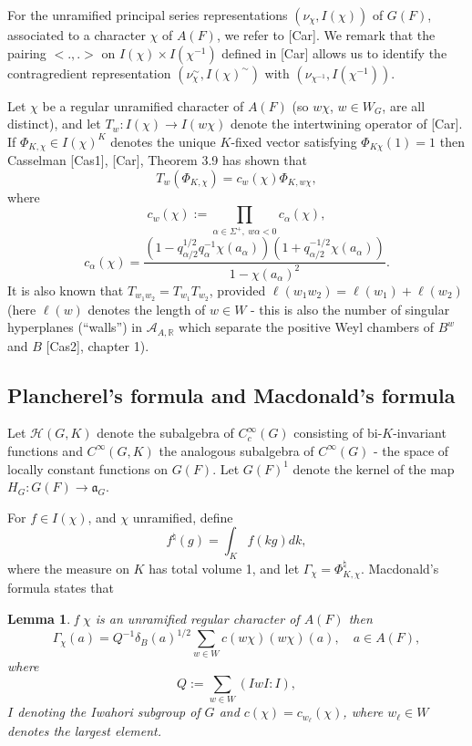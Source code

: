 \documentclass[12pt]{article}
\newtheorem{lemma}{Lemma}[section]
\begin{document}
For the unramified principal series representations $(\nu_\chi,I(\chi))$ of $G(F)$, associated to a character $\chi$ of $A(F)$, we refer to [Car]. We remark that the pairing $<.,.>$ on $I(\chi)\times I(\chi^{-1})$ defined in [Car] allows us to identify the contragredient representation $(\nu^\sim_\chi,I(\chi)^\sim)$ with $(\nu_{\chi^{-1}},I(\chi^{-1}))$.

Let $\chi$ be a regular unramified character of $A(F)$ (so $w\chi$, $w\in W_G$, are all distinct), and let $T_w:I(\chi)\rightarrow I(w\chi)$ denote the intertwining operator of [Car]. If $\Phi_{K,\chi}\in I(\chi)^K$ denotes the unique $K$-fixed vector satisfying $\Phi_{K\chi}(1)=1$ then Casselman [Cas1], [Car], Theorem 3.9 has shown that
\begin{equation}\tag{2.8}
T_w(\Phi_{K,\chi})=c_w(\chi)\Phi_{K,w\chi},
\end{equation}
where
\[
c_w(\chi):=\prod_{\alpha\in\Sigma^+,\ w\alpha<0}c_\alpha(\chi),
\]
\[
c_\alpha(\chi)=\frac{(1-q_{\alpha/2}^{1/2}q_\alpha^{-1}\chi(a_\alpha))(1+q_{\alpha/2}^{-1/2}\chi(a_\alpha))}{1-\chi(a_\alpha)^2}.
\]
It is also known that $T_{w_1w_2}=T_{w_1}T_{w_2}$, provided $\ell(w_1w_2)=\ell(w_1)+\ell(w_2)$ (here $\ell(w)$ denotes the length of $w\in W$ - this is also the number of singular hyperplanes (``walls'') in $\mathcal{A}_{A,\mathbb{R}}$ which separate the positive Weyl chambers of $B^w$ and $B$ [Cas2], chapter 1).

\subsection{Plancherel's formula and Macdonald's formula}

Let $\mathcal{H}(G,K)$ denote the subalgebra of $C_c^\infty(G)$ consisting of bi-$K$-invariant functions and $C^\infty(G,K)$ the analogous subalgebra of $C^\infty(G)$ - the space of locally constant functions on $G(F)$. Let $G(F)^1$ denote the kernel of the map $H_G:G(F)\rightarrow\mathfrak{a}_G$.

For $f\in I(\chi)$, and $\chi$ unramified, define
\[
f^\natural(g)=\int_Kf(kg)dk,
\]
where the measure on $K$ has total volume 1, and let $\Gamma_\chi=\Phi^\natural_{K,\chi}$. Macdonald's formula states that

\begin{lemma}
f $\chi$ is an unramified regular character of $A(F)$ then
\[
\Gamma_\chi(a)=Q^{-1}\delta_B(a)^{1/2}\sum_{w\in W}c(w\chi)(w\chi)(a),\quad a\in A(F),
\]
where
\[
Q:=\sum_{w\in W}(IwI:I),
\]
$I$ denoting the Iwahori subgroup of $G$ and $c(\chi)=c_{w_\ell}(\chi)$, where $w_\ell\in W$ denotes the largest element.
\end{lemma}
\end{document}

